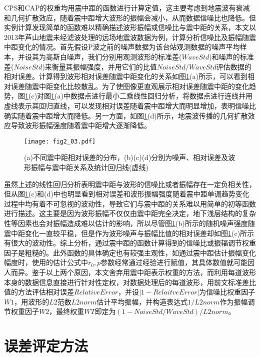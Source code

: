 CPS和CAP的权重均用震中距的函数进行计算定值，这主要考虑到地震波有衰减和几何扩散效应，随着震中距增大波形的振幅会减小，从而数据信噪比也降低。但实例计算发现简单的函数难以精确描述波形振幅或信噪比与震中距的关系，本文以2013年芦山地震未经滤波处理的远场地震波数据为例，计算分析信噪比及振幅随震中距变化的情况。首先假设P波之前的噪声数据为该台站观测数据的噪声平均样本，并设其为高斯白噪声，我们分别用观测波形的标准差($WaveStd$)和噪声的标准差($NoiseStd$)来衡量其振幅强度，并用它们的比值$NoiseStd/WaveStd$评估数据的相对误差。计算得到波形相对误差随震中距变化的关系如图\ref{fig2_03}(a)所示，可以看到相对误差随震中距变化比较散乱。为了使图像更直观展示相对误差随震中距的变化趋势，图\ref{fig2_03}(c)对图\ref{fig2_03}(a)中数据点进行最小二乘线性回归分析，将数据点进行连线并用虚线表示其回归直线，可以发现相对误差随着震中距增大而明显增加，表明信噪比确实随着震中距增大而降低。另一方面，如图\ref{fig2_03}(d)所示，地震波传播的几何扩散效应导致波形振幅强度随着震中距增大逐渐降低。
\begin{figure}
\centering
  \texttt{[image: fig2\_03.pdf]} 
  \caption{(a)不同震中距相对误差的分布，(b)(c)(d)分别为噪声、相对误差及波形振幅与震中距关系及统计回归线(虚线)}
  \label{fig2_03}
\end{figure}

虽然上述的线性回归分析表明震中距与波形的信噪比或者振幅存在一定负相关性，但从图\ref{fig2_03}(c)和(d)中也明显看到相对误差和波形振幅强度随着震中距单调趋势变化过程中均有着不可忽视的波动性，导致它们与震中距的关系难以用简单的初等函数进行描述。这主要是因为波形振幅不仅仅由震中距完全决定，地下浅层结构的复杂性等因素也会对振幅造成难以估计的影响，所以尽管图\ref{fig2_03}(b)所示的随机噪声强度随震中距变化一直较平稳，但是作为波形噪声与振幅比值的相对误差却如图\ref{fig2_03}(c)所示有很大的波动性。综上分析，通过震中距的函数计算得到的信噪比或振辐调节权重因子是粗糙的。此外函数的具体确定也有较强主观性，如\citet{Zhu1996}通过震中距估计振幅变化幅度时，使用的估计公式中$r_0,p$参数经常通过经验进行赋值，其具体数值就可能因人而异。鉴于以上两个原因，本文舍弃用震中距表示权重的方法，而利用每道波形本身的数据信息直接进行针对性定权，对数据处理后的每道波形，用前文标准差比值的方法评估相对误差$RelativeError$，并设$|1-RelaitveError|$为信噪比权重因子$W1$，用波形的$L2$范数$L2norm$估计平均振幅，并构造表达式$1/L2norm$作为振幅调节权重因子$W2$，最终权重$WT$即定为$(1-NoiseStd/WaveStd)/L2norm$。

\section{误差评定方法}

